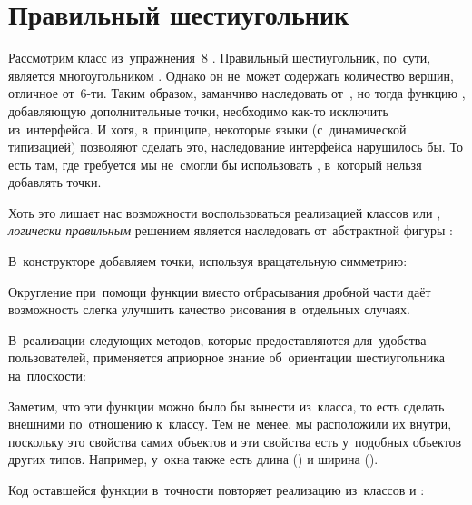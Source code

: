 
\section{Правильный шестиугольник}
Рассмотрим класс  из~упражнения~8 . Правильный шестиугольник, по~сути, является многоугольником . Однако он не~может содержать количество вершин, отличное от~6-ти. Таким образом, заманчиво наследовать от~, но тогда функцию , добавляющую дополнительные точки, необходимо как-то исключить из~интерфейса. И хотя, в~принципе, некоторые языки (с~динамической типизацией) позволяют сделать это, наследование интерфейса нарушилось бы. То есть там, где требуется  мы не~смогли бы использовать , в~который нельзя добавлять точки.

Хоть это лишает нас возможности воспользоваться реализацией классов  или , \emph{логически правильным} решением является наследовать от~абстрактной фигуры :


В~конструкторе добавляем точки, используя вращательную симметрию:


\noindent Округление при~помощи функции  вместо отбрасывания дробной части даёт возможность слегка улучшить качество рисования в~отдельных случаях.

В~реализации следующих методов, которые предоставляются для~удобства пользователей, применяется априорное знание об~ориентации шестиугольника на~плоскости:


Заметим, что эти функции можно было бы вынести из~класса, то есть сделать внешними по~отношению к~классу. Тем не~менее, мы расположили их внутри, поскольку это свойства самих объектов и эти свойства есть у~подобных объектов других типов. Например, у~окна также есть длина () и ширина ().

Код оставшейся функции  в~точности повторяет реализацию из~классов  и :

